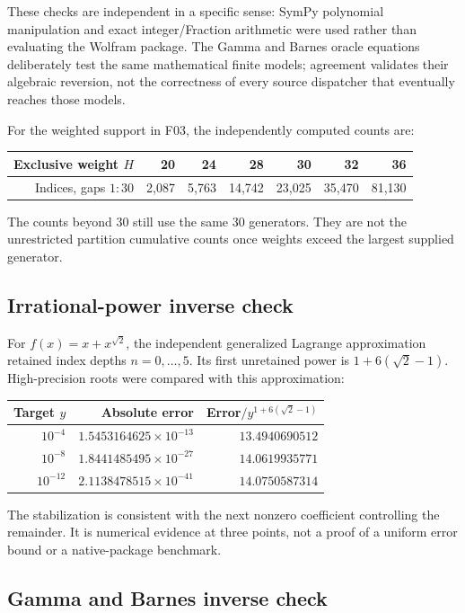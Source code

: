\documentclass[11pt,a4paper]{article}
\theoremstyle{definition}
\begin{document}
These checks are independent in a specific sense: SymPy polynomial manipulation and exact integer/Fraction arithmetic were used rather than evaluating the Wolfram package. The Gamma and Barnes oracle equations deliberately test the same mathematical finite models; agreement validates their algebraic reversion, not the correctness of every source dispatcher that eventually reaches those models.

For the weighted support in F03, the independently computed counts are:
\begin{center}
\begin{tabular}{@{}rrrrrrr@{}}
\toprule
Exclusive weight $H$ & 20 & 24 & 28 & 30 & 32 & 36\\
\midrule
Indices, gaps $1{:}30$ & 2,087 & 5,763 & 14,742 & 23,025 & 35,470 & 81,130\\
\bottomrule
\end{tabular}
\end{center}
The counts beyond 30 still use the same 30 generators. They are not the unrestricted partition cumulative counts once weights exceed the largest supplied generator.

\subsection{Irrational-power inverse check}

For $f(x)=x+x^{\sqrt2}$, the independent generalized Lagrange approximation retained index depths $n=0,\ldots,5$. Its first unretained power is $1+6(\sqrt2-1)$. High-precision roots were compared with this approximation:
\begin{center}
\begin{tabular}{@{}rrr@{}}
\toprule
Target $y$ & Absolute error & Error$/y^{1+6(\sqrt2-1)}$\\
\midrule
$10^{-4}$ & $1.5453164625\times10^{-13}$ & $13.4940690512$\\
$10^{-8}$ & $1.8441485495\times10^{-27}$ & $14.0619935771$\\
$10^{-12}$ & $2.1138478515\times10^{-41}$ & $14.0750587314$\\
\bottomrule
\end{tabular}
\end{center}
The stabilization is consistent with the next nonzero coefficient controlling the remainder. It is numerical evidence at three points, not a proof of a uniform error bound or a native-package benchmark.

\subsection{Gamma and Barnes inverse check}
\end{document}
